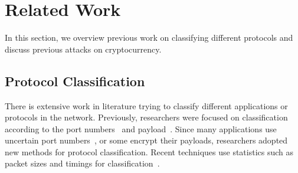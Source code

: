 
\section{Related Work}\label{related}


In this section, we overview previous work on 
classifying different protocols and discuss previous attacks on \bc cryptocurrency.

\subsection{Protocol Classification}
There is extensive work in literature trying to classify different applications or protocols in the network. Previously, researchers were focused on classification according to the port numbers~\cite{tcp_p2p,ports,port_mad,payload_p2p} and payload~\cite{payload_p2p,payload_content,payload_app,payload_moore}. Since many applications use uncertain port numbers~\cite{ports}, or some encrypt their payloads, researchers adopted new methods for protocol classification.
Recent techniques use statistics such as packet sizes and timings for classification~\cite{real_enc,web_p2p,blinc,prot_fing,semi,trafficClassSVM,svm2}. 
\begin{comment}
For example, in~\cite{blinc}, authors use a three-level classification mechanism -social, functional, and application level- to classify web, p2p, chat, media, gaming, data transfer, streaming, and network management traffic. Their result shows that their method can classify $80$ $-$ $90\%$ of traffic flows with more than $95\%$ accuracy. In~\cite{prot_fing}, authors use packet sizes, inter-arrival times, and their orderings to distinguish between HTTP, SMTP, SSH, etc. They use \textit{anomaly score} to check if a flow is statistically compatible with one of the traffic classes. Their approach results in more than $90\%$ hit-ratio for all the considered classes and false positive around $6\%$ in the worst scenario.

In~\cite{web_p2p}, authors use duration, number of bytes, and number
of packets to classify flows at the network core where only one side of the flow is available (server-to-client or client-to-server). They use the K-means algorithm for clustering traffics, including Web, P2P, FTP, and use byte and flow accuracy to evaluate their mechanism. 
They show that server-to-client datasets give the best performance: 95$\%$ and 79$\%$ flow and byte accuracy, respectively.\end{comment}

